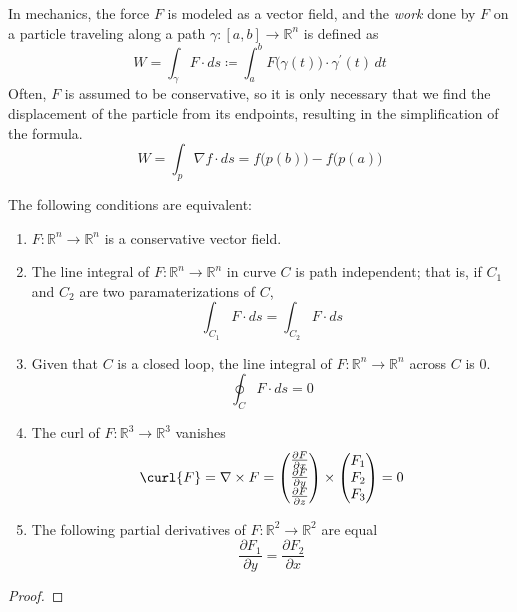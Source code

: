   \begin{example}[Work]
		In mechanics, the force $F$ is modeled as a vector field, and the \textit{work} done by $F$ on a particle traveling along a path $\gamma: [a, b] \to \mathbb{R}^n$ is defined as 
		\begin{equation}
		  W = \int_\gamma F \cdot ds \coloneqq \int_a^b F\big( \gamma(t)\big) \cdot \gamma^\prime (t) \, dt
		\end{equation}
		Often, $F$ is assumed to be conservative, so it is only necessary that we find the displacement of the particle from its endpoints, resulting in the simplification of the formula.  
		\begin{equation}
			W = \int_p \nabla f \cdot ds = f\big( p(b)\big) - f \big(p(a)\big)
		\end{equation}
  \end{example}
		
  \begin{corollary}
		The following conditions are equivalent: 
		\begin{enumerate}
			\item $F: \mathbb{R}^n \to \mathbb{R}^n$ is a conservative vector field. 
			\item The line integral of $F: \mathbb{R}^n \to \mathbb{R}^n$ in curve $C$ is path independent; that is, if $C_1$ and $C_2$ are two paramaterizations of $C$, 
			\[\int_{C_1} F \cdot ds = \int_{C_2} F \cdot ds\]
			\item Given that $C$ is a closed loop, the line integral of $F: \mathbb{R}^n \to \mathbb{R}^n$ across $C$ is $0$. 
			\[\oint_C F \cdot ds = 0\]
			\item The curl of $F: \mathbb{R}^3 \to \mathbb{R}^3$ vanishes
			\[\curl{F} = \nabla \times F = \begin{pmatrix}
			\frac{\partial F}{\partial x} \\\frac{\partial F}{\partial y} \\\frac{\partial F}{\partial z} 
			\end{pmatrix} \times \begin{pmatrix}
			F_1\\F_2\\F_3
			\end{pmatrix}= 0\]
			\item The following partial derivatives of $F: \mathbb{R}^2 \to \mathbb{R}^2$ are equal
			\[\frac{\partial F_1}{\partial y} = \frac{\partial F_2}{\partial x}\]
		\end{enumerate}
  \end{corollary}
	\begin{proof}
	\end{proof}
		
